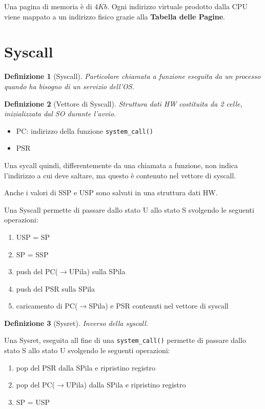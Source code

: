 \documentclass[12pt, a4paper]{report}
\newtheorem{definition}{Definizione}
\begin{document}
Una pagina di memoria è di $4Kb$. Ogni indirizzo virtuale prodotto dalla CPU
viene mappato a un indirizzo fisico grazie alla \textbf{Tabella delle Pagine}.

\section{Syscall}
\begin{definition}[Syscall]
	Particolare chiamata a funzione eseguita da un processo quando ha bisogno
	di un servizio dell'OS.
\end{definition}
\begin{definition}[Vettore di Syscall]
	Struttura dati HW costituita da 2 celle, inizializzata dal SO durante
	l'avvio.
\end{definition}
\begin{itemize}
	\item PC: indirizzo della funzione \texttt{system\_call()}
	\item PSR
\end{itemize}
Una sycall quindi, differentemente da una chiamata a funzione, non indica
l'indirizzo a cui deve saltare, ma questo è contenuto nel vettore di syscall.

Anche i valori di SSP e USP sono salvati in una struttura dati HW.

Una Syscall permette di passare dallo stato U allo stato S svolgendo le seguenti
operazioni:
\begin{enumerate}
	\item USP = SP
	\item SP = SSP
	\item push del PC($\to$UPila) sulla SPila
	\item push del PSR sulla SPila
	\item caricamento di PC($\to$SPila) e PSR contenuti nel vettore di syscall
\end{enumerate}

\begin{definition}[Sysret]
	Inverso della syscall.
\end{definition}
Una Sysret, eseguita all fine di una \texttt{system\_call()} permette di passare
dallo stato S allo stato U svolgendo le seguenti operazioni:
\begin{enumerate}
	\item pop del PSR dalla SPila e ripristino registro
	\item pop del PC($\to$UPila) dalla SPila e ripristino registro
	\item SP = USP
\end{enumerate}
\end{document}
